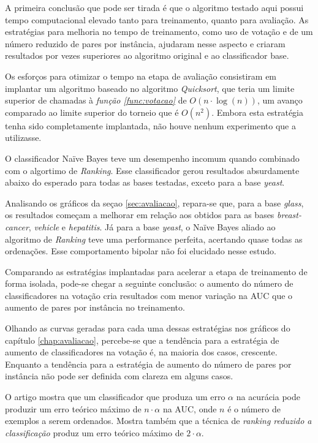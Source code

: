 A primeira conclusão que pode ser tirada é que o algoritmo testado aqui possui tempo computacional elevado tanto para treinamento, quanto para avaliação. As estratégias para melhoria no tempo de treinamento, como uso de votação e de um número reduzido de pares por instância, ajudaram nesse aspecto e criaram resultados por vezes superiores ao algoritmo original e ao classificador base.

Os esforços para otimizar o tempo na etapa de avaliação consistiram em implantar um algoritmo baseado no algoritmo \emph{Quicksort}, que teria um limite superior de chamadas à \emph{função \ref{func:votacao}} de $O(n \cdot \log(n))$, um avanço comparado ao limite superior do torneio que é $O(n^2)$. Embora esta estratégia tenha sido completamente implantada, não houve nenhum experimento que a utilizasse.

O classificador Naïve Bayes teve um desempenho incomum quando combinado com o algortimo de \emph{Ranking}. Esse classificador gerou resultados absurdamente abaixo do esperado para todas as bases testadas, exceto para a base \emph{yeast}.

Analisando os gráficos da seçao \ref{sec:avaliacao}, repara-se que, para a base \emph{glass}, os resultados começam a melhorar em relação aos obtidos para as bases \emph{breast-cancer}, \emph{vehicle} e \emph{hepatitis}. Já para a base \emph{yeast}, o Naïve Bayes aliado ao algoritmo de \emph{Ranking} teve uma performance perfeita, acertando quase todas as ordenações. Esse comportamento bipolar não foi elucidado nesse estudo.

Comparando as estratégias implantadas para acelerar a etapa de treinamento de forma isolada, pode-se chegar a seguinte conclusão: o aumento do número de classificadores na votação cria resultados com menor variação na AUC que o aumento de pares por instância no treinamento.

Olhando as curvas geradas para cada uma dessas estratégias nos gráficos do capítulo \ref{chap:avaliacao}, percebe-se que a tendência para a estratégia de aumento de classificadores na votação é, na maioria dos casos, crescente. Enquanto a tendência para a estratégia de aumento do número de pares por instância não pode ser definida com clareza em alguns casos.

O artigo \cite{langford08} mostra que um classificador que produza um erro $\alpha$ na acurácia pode produzir um erro teórico máximo de $n \cdot \alpha$ na AUC, onde $n$ é o número de exemplos a serem ordenados. Mostra também que a técnica de \emph{ranking reduzido a classificação} produz um erro teórico máximo de $2 \cdot \alpha$.

